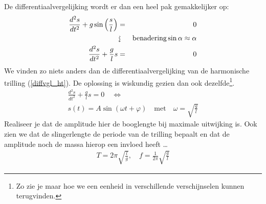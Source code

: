 \documentclass{ximera}
\begin{document}
	De differentiaalvergelijking wordt er dan een heel pak gemakkelijker op:
	\begin{eqnarray*}
	\frac{d^2s}{dt^2}+g\sin\left(\frac{s}{l}\right)&=&0\\
	&\rotatebox[origin=c]{-90}{$\rightsquigarrow$}&\mathrm{benadering} \sin\alpha\approx\alpha\\
	\frac{d^2s}{dt^2}+\frac{g}{l}s&=&0
	\end{eqnarray*}
	We vinden zo niets anders dan de differentiaalvergelijking van de harmonische trilling (\ref{diffvgl_ht}). De oplossing is wiskundig gezien dan ook dezelfde\footnote{Zo zie je maar hoe we een eenheid in verschillende verschijnselen kunnen terugvinden.}.
	\begin{gather*}
	\frac{d^2s}{dt^2}+\frac{g}{l}s=0\quad\Leftrightarrow\\
	s(t)=A\sin(\omega t+\varphi)\quad\mathrm{met}\quad\omega=\sqrt{\frac{g}{l}}
	\end{gather*}
	Realiseer je dat de amplitude hier de booglengte bij maximale uitwijking is. Ook zien we dat de slingerlengte de periode van de trilling bepaalt en dat de amplitude noch de massa hierop een invloed heeft \ldots
	\begin{eqnarray*}
	T=2\pi\sqrt{\frac{l}{g}},\quad f=\frac{1}{2\pi}\sqrt{\frac{g}{l}}
	\end{eqnarray*}
	
	
	
\end{document}
